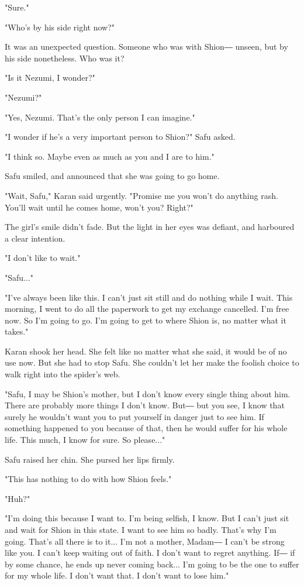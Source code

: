 "Sure."

"Who's by his side right now?"

It was an unexpected question. Someone who was with Shion― unseen, but
by his side nonetheless. Who was it?

"Is it Nezumi, I wonder?"

"Nezumi?"

"Yes, Nezumi. That's the only person I can imagine."

"I wonder if he's a very important person to Shion?" Safu asked.

"I think so. Maybe even as much as you and I are to him."

Safu smiled, and announced that she was going to go home.

"Wait, Safu," Karan said urgently. "Promise me you won't do anything
rash. You'll wait until he comes home, won't you? Right?"

The girl's smile didn't fade. But the light in her eyes was defiant, and
harboured a clear intention.

"I don't like to wait."

"Safu..."

"I've always been like this. I can't just sit still and do nothing while
I wait. This morning, I went to do all the paperwork to get my exchange
cancelled. I'm free now. So I'm going to go. I'm going to get to where
Shion is, no matter what it takes."

Karan shook her head. She felt like no matter what she said, it would be
of no use now. But she had to stop Safu. She couldn't let her make the
foolish choice to walk right into the spider's web.

"Safu, I may be Shion's mother, but I don't know every single thing
about him. There are probably more things I don't know. But― but you
see, I know that surely he wouldn't want you to put yourself in danger
just to see him. If something happened to you because of that, then he
would suffer for his whole life. This much, I know for sure. So
please..."

Safu raised her chin. She pursed her lips firmly.

"This has nothing to do with how Shion feels."

"Huh?"

"I'm doing this because I want to. I'm being selfish, I know. But I
can't just sit and wait for Shion in this state. I want to see him so
badly. That's why I'm going. That's all there is to it... I'm not a
mother, Madam― I can't be strong like you. I can't keep waiting out of
faith. I don't want to regret anything. If― if by some chance, he ends
up never coming back... I'm going to be the one to suffer for my whole
life. I don't want that. I don't want to lose him."

